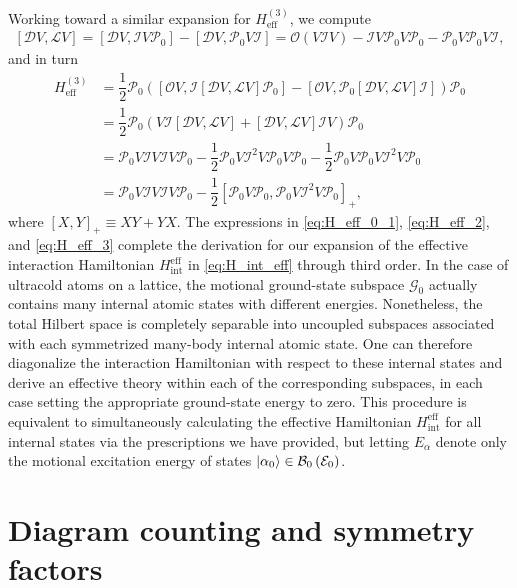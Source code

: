 \documentclass[preprint,showkeys,nofootinbib]{revtex4-1}
\renewcommand{\t}{\text} %
\newcommand{\f}{\dfrac} %
\newcommand{\p}[1]{\left(#1\right)} %
\renewcommand{\sp}[1]{\left[#1\right]} %
\newcommand{\B}{\mathcal{B}}
\newcommand{\D}{\mathcal{D}}
\newcommand{\E}{\mathcal{E}}
\newcommand{\G}{\mathcal{G}}
\newcommand{\I}{\mathcal{I}}
\renewcommand{\L}{\mathcal{L}}
\renewcommand{\O}{\mathcal{O}}
\renewcommand{\P}{\mathcal{P}}
\newcommand{\1}{\mathds{1}}
\begin{document}
Working toward a similar expansion for $H_{\t{eff}}^{(3)}$, we compute
\begin{align}
  \sp{\D V, \L V}
  = \sp{\D V, \I V \P_0} - \sp{\D V, \P_0 V \I}
  = \O\p{V \I V} - \I V \P_0 V \P_0 - \P_0 V \P_0 V \I,
\end{align}
and in turn
\begin{align}
  H_{\t{eff}}^{(3)}
  &= \f12 \P_0 \p{\sp{\O V, \I \sp{\D V, \L V} \P_0}
    - \sp{\O V, \P_0 \sp{\D V, \L V} \I}} \P_0 \\
  &= \f12 \P_0 \p{V \I \sp{\D V, \L V}
    + \sp{\D V, \L V} \I V} \P_0 \\
  &= \P_0 V \I V \I V \P_0
  - \f12 \P_0 V \I^2 V \P_0 V \P_0
  - \f12 \P_0 V \P_0 V \I^2 V \P_0 \\
  &= \P_0 V \I V \I V \P_0
  - \f12 \sp{\P_0 V \P_0, \P_0 V \I^2 V \P_0}_+,
  \label{eq:H_eff_3}
\end{align}
where $\sp{X,Y}_+\equiv XY+YX$.  The expressions in
\eqref{eq:H_eff_0_1}, \eqref{eq:H_eff_2}, and \eqref{eq:H_eff_3}
complete the derivation for our expansion of the effective interaction
Hamiltonian $H_{\t{int}}^{\t{eff}}$ in \eqref{eq:H_int_eff} through
third order.  In the case of ultracold atoms on a lattice, the
motional ground-state subspace $\G_0$ actually contains many internal
atomic states with different energies.  Nonetheless, the total Hilbert
space is completely separable into uncoupled subspaces associated with
each symmetrized many-body internal atomic state.  One can therefore
diagonalize the interaction Hamiltonian with respect to these internal
states and derive an effective theory within each of the corresponding
subspaces, in each case setting the appropriate ground-state energy to
zero.  This procedure is equivalent to simultaneously calculating the
effective Hamiltonian $H_{\t{int}}^{\t{eff}}$ for all internal states
via the prescriptions we have provided, but letting $E_\alpha$ denote
only the motional excitation energy of states
$\ket{\alpha_0}\in\B_0\p{\E_0}$.


\section{Diagram counting and symmetry factors}
\label{sec:diagrams}
\end{document}
